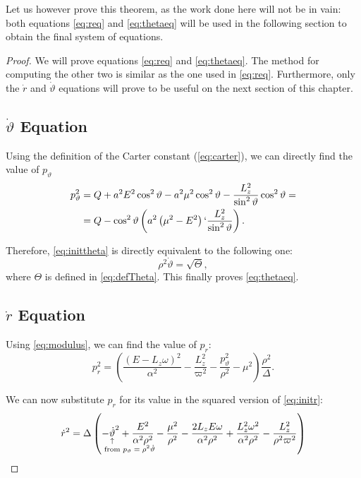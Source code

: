 Let us however prove this theorem, as the work done here will not be in vain: both equations \ref{eq:req} and \ref{eq:thetaeq} will be used in the following section to obtain the final system of equations.

\begin{proof}
	We will prove equations \ref{eq:req} and \ref{eq:thetaeq}. The method for computing the other two is similar as the one used in \ref{eq:req}. Furthermore, only the $\dot{r}$ and $\dot{\vartheta}$ equations will prove to be useful on the next section of this chapter.
	
	\subsection*{$\dot{\vartheta}$ Equation}
	
	Using the definition of the Carter constant (\autoref{eq:carter}), we can directly find the value of $p_\vartheta$
	\begin{align}
	p_\vartheta^2 &= Q + a^2E^2\cos^2\vartheta - a^2\mu^2\cos^2\vartheta - \frac{L_z^2}{\sin^2\vartheta}\cos^2\vartheta = \\
	&= Q - \cos^2\vartheta\left( a^2\left(\mu^2 - E^2 \right) `\frac{L_z^2}{\sin^2\vartheta} \right).
	\end{align}
	
	Therefore, \autoref{eq:inittheta} is directly equivalent to the following one:
	\begin{equation}
	\label{eq:sqrtTheta}
	\rho^2 \dot{\vartheta} = \sqrt{\Theta},
	\end{equation}
	where $\Theta$ is defined in \autoref{eq:defTheta}. This finally proves \autoref{eq:thetaeq}.
	
	\subsection*{$\dot{r}$ Equation}
	
	Using \autoref{eq:modulus}, we can find the value of $p_r$:
	\[
	p_r^2 = \left( \frac{(E - L_z\omega)^2}{\alpha^2} - \frac{L_z^2}{\varpi^2} - \frac{p_\vartheta^2}{\rho^2} - \mu^2 \right) \frac{\rho^2}{\Delta}.
	\]
	
	We can now substitute $p_r$ for its value in the squared version of \autoref{eq:initr}:
	\begin{equation}
	\label{eq:r1}
	\dot{r}^2 = \Delta \left( -\eqnote{\dot{\vartheta}}{from $p_\vartheta = \rho^2\dot{\vartheta}$}^2 + \frac{E^2}{\alpha^2\rho^2} - \frac{\mu^2}{\rho^2} - \frac{2L_zE\omega}{\alpha^2\rho^2} + \frac{L_z^2\omega^2}{\alpha^2\rho^2} - \frac{L_z^2}{\rho^2\varpi^2} \right)
	\end{equation}
	

\end{proof}
